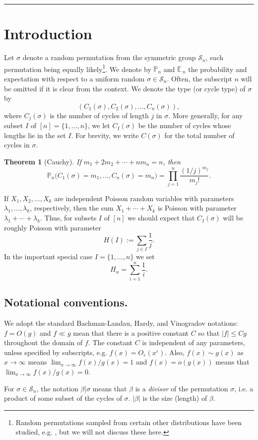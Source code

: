 \documentclass[10pt]{article}
\newtheorem{thm}{Theorem}[section]
\newcommand{\cS}{\ensuremath{\mathcal{S}}}
\newcommand{\PR}{\mathbb P}
\newcommand{\E}{{\mathbb E}\,}
\newcommand{\eps}{\ensuremath{\varepsilon}}
\renewcommand{\le}{\leqslant}
\renewcommand{\(}{\left(}
\renewcommand{\)}{\right)}
\begin{document}
\medskip\hrule\medskip
\section{Introduction}
Let $\sigma$ denote a random permutation from
the symmetric group $\cS_n$, each permutation being equally
likely\footnote{Random permutations sampled
from certain other distributions have been studied, e.g. \cite{ABTbook}, but we will not discuss these here.}.
We denote by $\PR_n$ and $\E_n$ the probability and expectation
with respect to a uniform random $\sigma\in \cS_n$.
Often, the subscript $n$ will be omitted if it is clear from the context.
We denote the type (or cycle type) of $\sigma$ by
\[
(C_1(\sigma), C_2(\sigma),\ldots, C_n(\sigma)),
\]
where
$C_j(\sigma)$ is the number of cycles of length $j$ in $\sigma$.
More generally, for any subset $I$ of $[n]=\{1,\ldots,n\}$, we let $C_I(\sigma)$
be the number of cycles whose lengths lie in the set $I$.
For brevity, we write $C(\sigma)$ for the total number of
cycles in $\sigma$.
\setcounter{thm}{1}
\begin{thm}[Cauchy]\label{thm:Cauchy}
If $m_1+2m_2+\cdots+nm_n=n$, then
\[
\PR_n \big( C_1(\sigma)=m_1,\ldots,C_n(\sigma)=m_n \big) = \prod_{j=1}^n \frac{(1/j)^{m_j}}{m_j!}.
\]
\end{thm}
If  $X_1, X_2, \ldots, X_k$ are independent Poisson random variables 
with parameters $\lambda_1,\ldots,\lambda_k$, respectively, then the sum
$X_1+\cdots +X_k$ is Poisson with parameter $\lambda_1+\cdots+\lambda_k$.
Thus, for subsets $I$ of $[n]$ we should expect that $C_I(\sigma)$ will be roughly 
Poisson with parameter 
\[
H(I) := \sum_{j\in I} \frac{1}{j}.
\]
In the important special case $I=\{1,\ldots,n\}$ we set 
\[
H_n = \sum_{i=1}^n \frac{1}{i}.
\]
\subsection{Notational conventions.}
We adopt the standard Bachman-Landau, Hardy, and Vinogradov notations:
$f=O(g)$ and $f\ll g$ mean that there is a positive constant $C$
so that $|f| \le Cg$ throughout the domain of $f$.  The constant $C$ is independent of any parameters, unless specified by subscripts, e.g.
$f(x)=O_{\eps} (x^\eps)$.
Also, $f(x) \sim g(x)$ as $x\to \infty$ means $\lim_{x\to \infty} f(x)/g(x)=1$
and $f(x)=o(g(x))$ means that $\lim_{x\to\infty} f(x)/g(x)=0$.

For $\sigma\in \cS_n$, the notation
$\beta|\sigma$ means that $\beta$ is a \emph{divisor} of the permutation
$\sigma$, i.e. a product of some subset of the cycles of $\sigma$.
$|\beta|$ is the size (length) of $\beta$.
\end{document}
